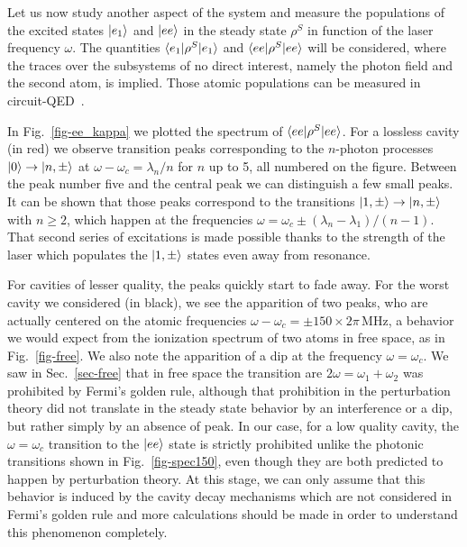 Let us now study another aspect of the system and measure the populations of the excited states $| e_1 \rangle$ and $| ee \rangle$ in the steady state $\rho^S$ in function of the laser frequency $\omega$. The quantities $\langle e_1 | \rho^S | e_1 \rangle$ and $\langle ee | \rho^S | ee \rangle$ will be considered, where the traces over the subsystems of no direct interest, namely the photon field and the second atom, is implied. Those atomic populations can be measured in circuit-QED~\cite{Fil09}.

In Fig.~\ref{fig-ee_kappa} we plotted the spectrum of $\langle ee | \rho^S | ee \rangle$. For a lossless cavity (in red) we observe transition peaks corresponding to the $n$-photon processes $| 0 \rangle \rightarrow | n,\pm \rangle$ at $\omega-\omega_c=\lambda_n/n$ for $n$ up to 5, all numbered on the figure. Between the peak number five and the central peak we can distinguish a few small peaks. It can be shown that those peaks correspond to the transitions $| 1,\pm \rangle \rightarrow | n,\pm \rangle$ with $n\ge2$, which happen at the frequencies $\omega=\omega_c \pm (\lambda_n-\lambda_1)/(n-1)$. That second series of excitations is made possible thanks to the strength of the laser which populates the $| 1,\pm \rangle$ states even away from resonance.

For cavities of lesser quality, the peaks quickly start to fade away. For the worst cavity we considered (in black), we see the apparition of two peaks, who are actually centered on the atomic frequencies $\omega-\omega_c = \pm 150 \times 2\pi\,\mbox{MHz}$, a behavior we would expect from the ionization spectrum of two atoms in free space, as in Fig.~\ref{fig-free}. We also note the apparition of a dip at the frequency $\omega=\omega_c$. We saw in Sec.~\ref{sec-free} that in free space the transition are $2\omega=\omega_1+\omega_2$ was prohibited by Fermi's golden rule, although that prohibition in the perturbation theory did not translate in the steady state behavior by an interference or a dip, but rather simply by an absence of peak. In our case, for a low quality cavity, the $\omega=\omega_c$ transition to the $| ee \rangle$ state is strictly prohibited unlike the photonic transitions shown in Fig.~\ref{fig-spec150}, even though they are both predicted to happen by perturbation theory. At this stage, we can only assume that this behavior is induced by the cavity decay mechanisms which are not considered in Fermi's golden rule and more calculations should be made in order to understand this phenomenon completely.

